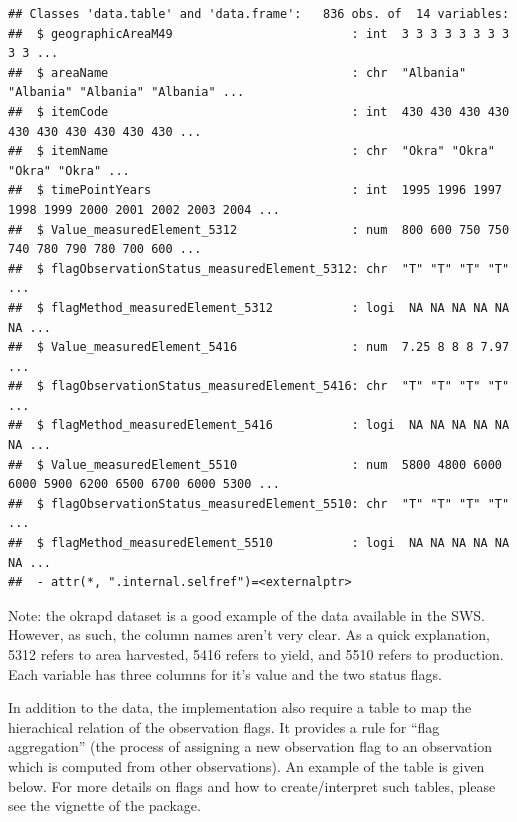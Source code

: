 \documentclass[nojss]{jss}
\begin{document}
\begin{knitrout}
\color{fgcolor}\begin{kframe}
\begin{alltt}
\end{alltt}
\begin{verbatim}
## Classes 'data.table' and 'data.frame':	836 obs. of  14 variables:
##  $ geographicAreaM49                         : int  3 3 3 3 3 3 3 3 3 3 ...
##  $ areaName                                  : chr  "Albania" "Albania" "Albania" "Albania" ...
##  $ itemCode                                  : int  430 430 430 430 430 430 430 430 430 430 ...
##  $ itemName                                  : chr  "Okra" "Okra" "Okra" "Okra" ...
##  $ timePointYears                            : int  1995 1996 1997 1998 1999 2000 2001 2002 2003 2004 ...
##  $ Value_measuredElement_5312                : num  800 600 750 750 740 780 790 780 700 600 ...
##  $ flagObservationStatus_measuredElement_5312: chr  "T" "T" "T" "T" ...
##  $ flagMethod_measuredElement_5312           : logi  NA NA NA NA NA NA ...
##  $ Value_measuredElement_5416                : num  7.25 8 8 8 7.97 ...
##  $ flagObservationStatus_measuredElement_5416: chr  "T" "T" "T" "T" ...
##  $ flagMethod_measuredElement_5416           : logi  NA NA NA NA NA NA ...
##  $ Value_measuredElement_5510                : num  5800 4800 6000 6000 5900 6200 6500 6700 6000 5300 ...
##  $ flagObservationStatus_measuredElement_5510: chr  "T" "T" "T" "T" ...
##  $ flagMethod_measuredElement_5510           : logi  NA NA NA NA NA NA ...
##  - attr(*, ".internal.selfref")=<externalptr>
\end{verbatim}
\end{kframe}
\end{knitrout}

Note: the okrapd dataset is a good example of the data available in the SWS.
However, as such, the column names aren't very clear.  As a quick explanation,
5312 refers to area harvested, 5416 refers to yield, and 5510 refers to
production.  Each variable has three columns for it's value and the two status
flags.

In addition to the data, the implementation also require a table to
map the hierachical relation of the observation flags. It
provides a rule for ``flag aggregation'' (the process of assigning a new
observation flag to an observation which is computed from other observations).
An example of the table is given below. For more details on flags and how to
create/interpret such tables, please see the vignette of the 
package.
\end{document}
